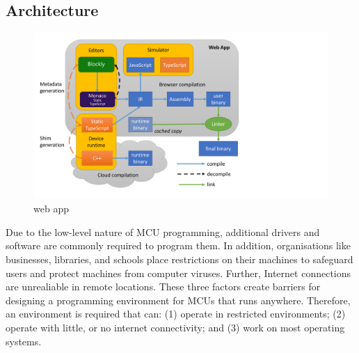 




\subsection{Architecture}

\begin{figure}[t]
    \includegraphics[width=4.8in]{makecodeFig.pdf}
\caption{\label{fig:makecode}\MC web app}
\end{figure}

Due to the low-level nature of MCU programming, additional drivers and software are commonly required to program them. In addition, organisations like businesses, libraries, and schools place restrictions on their machines to safeguard users and protect machines from computer viruses. Further, Internet connections are unrealiable in remote locations. These three factors create barriers for designing a programming environment for MCUs that runs anywhere. Therefore, an environment is required that can: (1) operate in restricted environments; (2) operate with little, or no internet connectivity; and (3) work on most operating systems.


